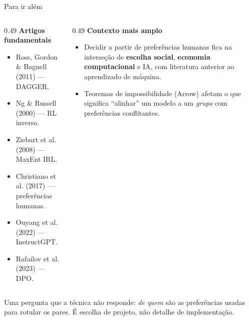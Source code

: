 \documentclass[aspectratio=169, 11pt]{beamer}
\begin{document}
\begin{frame}{Para ir além}

  \begin{columns}[T]
  \begin{column}{0.49\textwidth}
    \textbf{Artigos fundamentais}
    \begin{itemize}\setlength{\itemsep}{0ex}
      \item Ross, Gordon \& Bagnell (2011) --- DAGGER.
      \item Ng \& Russell (2000) --- RL inverso.
      \item Ziebart et al. (2008) --- MaxEnt IRL.
      \item Christiano et al. (2017) --- preferências humanas.
      \item Ouyang et al. (2022) --- InstructGPT.
      \item Rafailov et al. (2023) --- DPO.
    \end{itemize}
  \end{column}
  \begin{column}{0.49\textwidth}
    \textbf{Contexto mais amplo}
    \begin{itemize}\setlength{\itemsep}{0ex}
      \item Decidir a partir de preferências humanas fica na interseção de
        \textbf{escolha social}, \textbf{economia computacional} e IA, com
        literatura anterior ao aprendizado de máquina.
      \item Teoremas de impossibilidade (Arrow) afetam o que significa
        ``alinhar'' um modelo a um \emph{grupo} com preferências conflitantes.
    \end{itemize}
  \end{column}
  \end{columns}

  \begin{alertabox}
    Uma pergunta que a técnica não responde: \emph{de quem} são as preferências
    usadas para rotular os pares. É escolha de projeto, não detalhe de
    implementação.
  \end{alertabox}
\end{frame}
\end{document}
